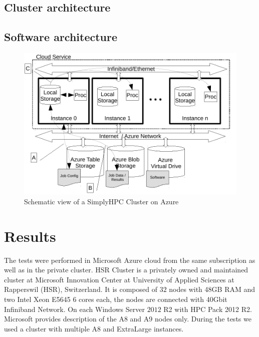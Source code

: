 \documentclass[3p,times]{elsarticle}
\begin{document}
\subsection{Cluster architecture}



\subsection{Software architecture}

\begin{figure}
	\centering
	\includegraphics[width=.9\linewidth]{azureDeployment.pdf}

	\caption{Schematic view of a SimplyHPC Cluster on Azure}	
	\label{fig:schemaService}
\end{figure}



\section{Results}
\label{sec:results}
	
The tests were performed in Microsoft Azure cloud from the same subscription as well as in the private cluster. HSR Cluster is a privately owned and maintained cluster at Microsoft Innovation Center at University of Applied Sciences at Rapperswil (HSR), Switzerland. It is composed of $32$ nodes with 48GB RAM and two Intel Xeon E5645 6 cores each, the nodes are connected with 40Gbit Infiniband Network. On each Windows Server $2012$ R2 with HPC Pack 2012 R2. Microsoft provides description of the A8 and A9 nodes only. During the tests we used a cluster with multiple A8 and ExtraLarge instances.
\end{document}

